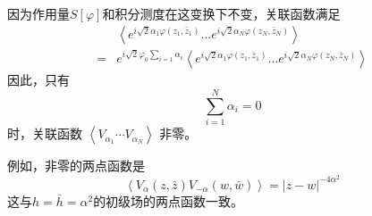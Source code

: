 因为作用量$ S[\varphi] $和积分测度在这变换下不变，关联函数满足
\begin{equation}
	\begin{aligned} &\left\langle e^{i \sqrt{2} \alpha_{1} \varphi\left(z_{1}, \bar{z}_{1}\right)} \ldots e^{i \sqrt{2} \alpha_{N} \varphi\left(z_{N}, \bar{z}_{N}\right)}\right\rangle \\ =& e^{i \sqrt{2} \varphi_{0} \sum_{i=1} \alpha_{i}}\left\langle e^{i \sqrt{2} \alpha_{1} \varphi\left(z_{1}, \bar{z}_{1}\right)} \ldots e^{i \sqrt{2} \alpha_{N} \varphi\left(z_{N}, \bar{z}_{N}\right)}\right\rangle \end{aligned}
\end{equation}
因此，只有
$$
\sum_{i=1}^{N} \alpha_{i}=0
$$
时，关联函数 $\left\langle V_{\alpha_{1}} \cdots V_{\alpha_{N}}\right\rangle$ 非零。

例如，非零的两点函数是
\begin{equation}
	\left\langle V_{\alpha}(z, \bar{z}) V_{-\alpha}(w, \bar{w})\right\rangle=|z-w|^{-4 \alpha^{2}}
\end{equation}
这与$ h=\bar{h}=\alpha^2 $的初级场的两点函数一致。
